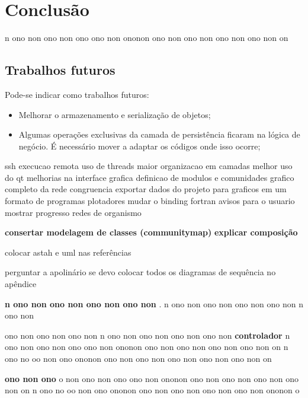 \chapter{Conclusão} \label{cap:conclusao}

n ono non ono non ono ono non ononon ono non ono non ono non ono non on

\section{Trabalhos futuros}

Pode-se indicar como trabalhos futuros:

\begin{itemize}
  \item{Melhorar o armazenamento e serialização de objetos;}
  \item{Algumas operações exclusivas da camada de persistência ficaram na lógica de negócio. É necessário mover a adaptar os códigos onde isso ocorre;}
\end{itemize}

ssh execucao remota
uso de threads
maior organizacao em camadas
melhor uso do qt
melhorias na interface grafica
definicao de modulos e comunidades
grafico completo da rede
congruencia
exportar dados do projeto para graficos em um formato de programas plotadores
mudar o binding fortran
avisos para o usuario
mostrar progresso
redes de organismo

\textbf{consertar modelagem de classes (communitymap)}
\textbf{explicar composição}

colocar astah e uml nas referências

perguntar a apolinário se devo colocar todos os diagramas de sequência no apêndice

\textbf{n ono non ono non ono non ono non }.
n ono non ono non ono non ono non n ono non 

ono non ono non ono non n ono non ono non ono non ono non 
\textbf{controlador} n ono non ono non ono ono non ononon ono non ono non ono non ono non on
n ono no oo non ono ononon ono  non ono non ono non ono non ono non on

\textbf{ono non ono}
o non ono non ono ono non ononon ono non ono non ono non ono non on
n ono no oo non ono ononon ono  non ono non ono non ono non ononon o 

